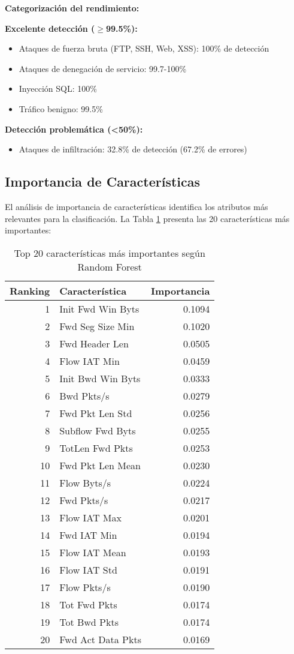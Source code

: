 \textbf{Categorización del rendimiento:}

\textbf{Excelente detección ($\geq$99.5\%):}
\begin{itemize}
\item Ataques de fuerza bruta (FTP, SSH, Web, XSS): 100\% de detección
\item Ataques de denegación de servicio: 99.7-100\%
\item Inyección SQL: 100\%
\item Tráfico benigno: 99.5\%
\end{itemize}

\textbf{Detección problemática (<50\%):}
\begin{itemize}
\item Ataques de infiltración: 32.8\% de detección (67.2\% de errores)
\end{itemize}

\subsection{Importancia de Características}

El análisis de importancia de características identifica los atributos más relevantes para la clasificación. La Tabla \ref{tab:feature_importance} presenta las 20 características más importantes:

\begin{table}[H]
\centering
\begin{tabular}{rlr}
\toprule
\textbf{Ranking} & \textbf{Característica} & \textbf{Importancia} \\
\midrule
1 & Init Fwd Win Byts & 0.1094 \\
2 & Fwd Seg Size Min & 0.1020 \\
3 & Fwd Header Len & 0.0505 \\
4 & Flow IAT Min & 0.0459 \\
5 & Init Bwd Win Byts & 0.0333 \\
6 & Bwd Pkts/s & 0.0279 \\
7 & Fwd Pkt Len Std & 0.0256 \\
8 & Subflow Fwd Byts & 0.0255 \\
9 & TotLen Fwd Pkts & 0.0253 \\
10 & Fwd Pkt Len Mean & 0.0230 \\
11 & Flow Byts/s & 0.0224 \\
12 & Fwd Pkts/s & 0.0217 \\
13 & Flow IAT Max & 0.0201 \\
14 & Fwd IAT Min & 0.0194 \\
15 & Flow IAT Mean & 0.0193 \\
16 & Flow IAT Std & 0.0191 \\
17 & Flow Pkts/s & 0.0190 \\
18 & Tot Fwd Pkts & 0.0174 \\
19 & Tot Bwd Pkts & 0.0174 \\
20 & Fwd Act Data Pkts & 0.0169 \\
\bottomrule
\end{tabular}
\caption{Top 20 características más importantes según Random Forest}
\label{tab:feature_importance}
\end{table}


